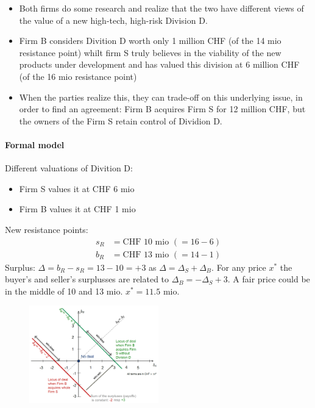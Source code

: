 \begin{itemize}
    \item Both firms do some research and realize that the two have different views
        of the value of a new high-tech, high-risk Division D.
    \item Firm B considers Divition D worth only 1 million CHF (of the 14 mio resistance point)
        whilt firm S truly believes in the viability of the new products under development
        and has valued this division at 6 million CHF (of the 16 mio resistance point)
    \item When the parties realize this, they can trade-off on this underlying issue,
        in order to find an agreement: Firm B acquires Firm S for 12 million CHF,
        but the owners of the Firm S retain control of Dividion D.
\end{itemize}

\paragraph{Formal model}

Different valuations of Divition D:
\begin{itemize}
    \item Firm S values it at CHF 6 mio
    \item Firm B values it at CHF 1 mio
\end{itemize}
New resistance points:
\begin{align*}
    s_R &= \text{CHF } 10 \text{ mio } (= 16-6)
    \\
    b_R &= \text{CHF } 13 \text{ mio } (= 14-1)
\end{align*}
Surplus: $\Delta = b_R - s_R = 13-10 = +3$ as $\Delta = \Delta_S + \Delta_B$.
For any price $x^\ast$ the buyer's and seller's surplusses are related to
$\Delta_B = - \Delta_S + 3$. A fair price could be in the middle of 10 and 13 mio.
$x^\ast = 11.5$ mio.

\begin{figure}[h]
    \centering
    \includegraphics[width=0.5\textwidth]{Pictures/Integrative_negotiation_plot.png}
\end{figure}

